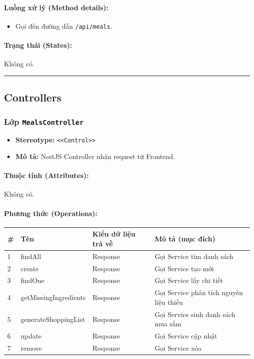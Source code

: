 \documentclass[12pt,a4paper]{article}
\begin{document}
\paragraph{Luồng xử lý (Method details):}
\begin{itemize}[leftmargin=*]
    \item Gọi đến đường dẫn \texttt{/api/meals}.
\end{itemize}


\paragraph{Trạng thái (States):}
Không có.

\vskip 0.5cm
\noindent\rule{\textwidth}{0.5pt}
\vskip 0.5cm

\subsection{Controllers}

\subsubsection{Lớp \texttt{MealsController}}
\begin{itemize}[leftmargin=*]
    \item \textbf{Stereotype:} \texttt{\textless{}\textless{}Control\textgreater{}\textgreater{}}
    \item \textbf{Mô tả:} NestJS Controller nhận request từ Frontend.
\end{itemize}

\paragraph{Thuộc tính (Attributes):}
Không có.

\paragraph{Phương thức (Operations):}
\begin{longtable}{|p{0.6cm}|p{3.8cm}|p{2.6cm}|p{6.5cm}|}
\hline
\textbf{\#} & \textbf{Tên} & \textbf{Kiểu dữ liệu trả về} & \textbf{Mô tả (mục đích)} \\ \hline
\endhead
1 & findAll & Response & Gọi Service tìm danh sách \\ \hline
2 & create & Response & Gọi Service tạo mới \\ \hline
3 & findOne & Response & Gọi Service lấy chi tiết \\ \hline
4 & getMissingIngredients & Response & Gọi Service phân tích nguyên liệu thiếu \\ \hline
5 & generateShoppingList & Response & Gọi Service sinh danh sách mua sắm \\ \hline
6 & update & Response & Gọi Service cập nhật \\ \hline
7 & remove & Response & Gọi Service xóa \\ \hline
\end{longtable}
\end{document}
